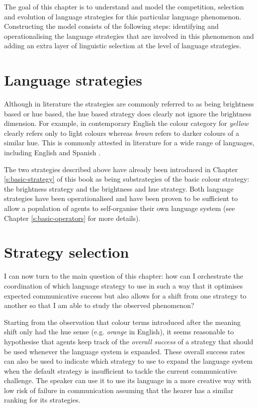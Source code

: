The goal of this chapter is to understand and model the competition,
selection and evolution of language strategies for this particular
language phenomenon. Constructing the model consists of the following
steps: identifying and operationalising the language strategies that
are involved in this phenomenon and adding an extra layer of
linguistic selection at the level of language strategies.

\section{Language strategies}

Although in literature the strategies are commonly referred to as
being brightness based or hue based, the hue based strategy does
clearly not ignore the brightness dimension. For example, in
contemporary English the colour category for \textit{yellow} clearly refers
only to light colours whereas \textit{brown} refers to darker colours of a
similar hue. This is commonly attested in literature for a wide range
of languages, including English \citep{sturges95location,
  boynton97insights} and Spanish \citep{lillo07locating}.

The two strategies described above have already been introduced in
Chapter \ref{s:basic-strategy} of this book as being substrategies
of the basic colour strategy: the brightness strategy
and the brightness and hue strategy. Both language strategies
have been operationalised and have been proven to be sufficient to
allow a population of agents to self-organise their own language
system (see Chapter \ref{s:basic-operators} for more details).

\section{Strategy selection}

I can now turn to the main question of this chapter: how can I
orchestrate the coordination of which language strategy to use in such
a way that it optimises expected communicative success but also allows
for a shift from one strategy to another so that I am able to study
the observed phenomenon?

Starting from the observation that colour terms introduced after the
meaning shift only had the hue sense (e.g. \textit{orange} in English), it
seems reasonable to hypothesise that agents keep track of the
\emph{overall success} of a strategy that should be used whenever the
language system is expanded. These overall success rates can also be
used to indicate which strategy to use to expand the language system
when the default strategy is insufficient to tackle the current
communicative challenge. The speaker can use it to use its language in
a more creative way with low risk of failure in communication assuming
that the hearer has a similar ranking for its strategies.

